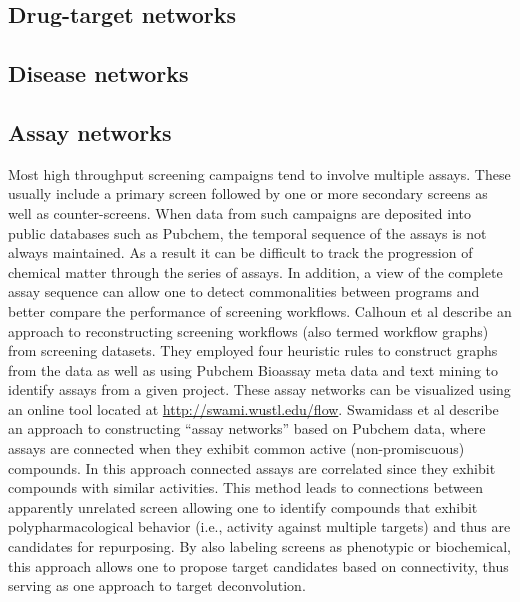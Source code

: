 \documentclass[12pt,letterpaper]{article}
\begin{document}
\subsection{Drug-target networks}
\label{sec:drug-target-networks}


\subsection{Disease networks}
\label{sec:disease-networks}

\subsection{Assay networks}
\label{sec:assay-networks}

Most high throughput screening campaigns tend to involve multiple
assays. These usually include a primary screen followed by one or more
secondary screens as well as counter-screens. When data from such
campaigns are deposited into public databases such as Pubchem, the
temporal sequence of the assays is not always maintained. As a result
it can be difficult to track the progression of chemical matter
through the series of assays. In addition, a view of the complete
assay sequence can allow one to detect commonalities between programs
and better compare the performance of screening workflows. Calhoun et
al \cite{Calhoun:2012uq} describe an approach to reconstructing
screening workflows (also termed workflow graphs) from screening
datasets. They employed four heuristic rules to construct graphs from
the data as well as using Pubchem Bioassay meta data and text mining
to identify assays from a given project. These assay networks can be
visualized using an online tool located at
\href{http://swami.wustl.edu/flow}{http://swami.wustl.edu/flow}.
Swamidass et al \cite{Swamidass:2014vn} describe an approach to
constructing ``assay networks'' based on Pubchem data, where assays
are connected when they exhibit common active (non-promiscuous)
compounds. In this approach connected assays are correlated since they
exhibit compounds with similar activities. This method leads to
connections between apparently unrelated screen allowing one to
identify compounds that exhibit polypharmacological behavior (i.e.,
activity against multiple targets) and thus are candidates for
repurposing. By also labeling screens as phenotypic or biochemical,
this approach allows one to propose target candidates based on
connectivity, thus serving as one approach to target deconvolution.
\end{document}

